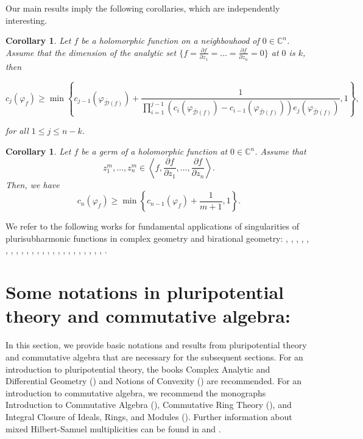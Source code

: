 \documentclass[a4paper,oneside,reqno,11pt]{article}
\newtheorem{corollary}[theorem]{Corollary}
\begin{document}
Our main results imply the following corollaries, which are independently interesting.

\begin{corollary}\label{Corollary1} 
Let $f$ be a holomorphic function on a neighbouhood of $0\in\mathbb C^n$. Assume that the dimension of the analytic set $\{f = \frac { \partial f } { \partial z_1 } = ... = \frac { \partial f } { \partial z_n }= 0\}$ at $0$ is $k$, then

$$c_j ( \varphi_{ f } ) \geq \min \left\{ c_{ j - 1} ( \varphi_{ \bar { \mathcal  D } ( f ) } ) + \frac { 1 } { \prod\limits_{ i = 1 }^{ j - 1 } ( c_{ i } ( \varphi_{ \bar { \mathcal  D } ( f ) } ) - c_{ i - 1 } ( \varphi_{ \bar { \mathcal  D } ( f ) } ) ) e_j ( \varphi_{ \bar { \mathcal  D } ( f ) } ) }, 1\right\},$$

for all $1\leq j\leq n - k$.
\end{corollary}

\begin{corollary}\label{Corollary2} 
Let $f$ be a germ of a holomorphic function at $0 \in \mathbb{C}^n$. Assume that 
$$z_1^m, \dots, z_n^m \in \left< f, \frac{\partial f}{\partial z_1}, \dots, \frac{\partial f}{\partial z_n} \right>.$$
Then, we have
$$c_n(\varphi_f) \geq \min \left\{ c_{n-1}(\varphi_{ f } ) + \frac{1}{m+1}, 1 \right\}.$$
\end{corollary}


We refer to the following works for fundamental applications of singularities of plurisubharmonic functions in complex geometry and birational geometry: \cite{Bi14}, \cite{Be09}, \cite{BBN11}, \cite{BFFU15}, \cite{Ch05}, \cite{Co95}, \cite{Co00}, \cite{dFEM03}, \cite{dFEM04}, \cite{dFEM10}, \cite{DM23}, \cite{EM21}, \cite{FJ05} \cite{De93b}, \cite{DP04}, \cite{GZ15a}, \cite{GZ15b}, \cite{HMX14}, \cite{EGZ09}, \cite{IM72}, \cite{Pa07}, \cite{Pu87}, \cite{Pu02}, \cite{Is01}, \cite{PS00}, \cite{Ti87}.

\section{Some notations in pluripotential theory and commutative algebra:}

In this section, we provide basic notations and results from pluripotential theory and commutative algebra that are necessary for the subsequent sections. For an introduction to pluripotential theory, the books Complex Analytic and Differential Geometry (\cite{De12}) and Notions of Convexity (\cite{Ho94}) are recommended. For an introduction to commutative algebra, we recommend the monographs Introduction to Commutative Algebra (\cite{AM69}), Commutative Ring Theory (\cite{Ma86}), and Integral Closure of Ideals, Rings, and Modules (\cite{SH06}). Further information about mixed Hilbert-Samuel multiplicities can be found in \cite{AB58} and \cite{Te73}.
\end{document}
